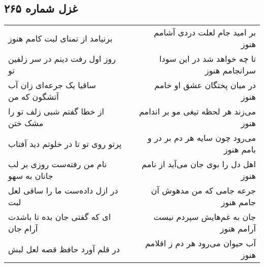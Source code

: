 \begin{center}
\section*{غزل شماره ۲۶۵}
\label{sec:sh265}
\begin{longtable}{l p{0.5cm} r}
برنیامد از تمنای لبت کامم هنوز
&&
بر امید جام لعلت دردی آشامم هنوز
\\
روز اول رفت دینم در سر زلفین تو
&&
تا چه خواهد شد در این سودا سرانجامم هنوز
\\
ساقیا یک جرعه‌ای زان آب آتشگون که من
&&
در میان پختگان عشق او خامم هنوز
\\
از خطا گفتم شبی زلف تو را مشک ختن
&&
می‌زند هر لحظه تیغی مو بر اندامم هنوز
\\
پرتو روی تو تا در خلوتم دید آفتاب
&&
می‌رود چون سایه هر دم بر در و بامم هنوز
\\
نام من رفته‌ست روزی بر لب جانان به سهو
&&
اهل دل را بوی جان می‌آید از نامم هنوز
\\
در ازل داده‌ست ما را ساقی لعل لبت
&&
جرعه جامی که من مدهوش آن جامم هنوز
\\
ای که گفتی جان بده تا باشدت آرام جان
&&
جان به غم‌هایش سپردم نیست آرامم هنوز
\\
در قلم آورد حافظ قصه لعل لبش
&&
آب حیوان می‌رود هر دم ز اقلامم هنوز
\\
\end{longtable}
\end{center}
